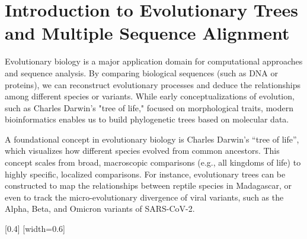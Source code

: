 


\section{Introduction to Evolutionary Trees and Multiple Sequence Alignment}

Evolutionary biology is a major application domain for computational approaches and sequence analysis. By comparing biological sequences (such as DNA or proteins), we can reconstruct evolutionary processes and deduce the relationships among different species or variants. While early conceptualizations of evolution, such as Charles Darwin's "tree of life," focused on morphological traits, modern bioinformatics enables us to build phylogenetic trees based on molecular data.

A foundational concept in evolutionary biology is Charles Darwin's ``tree of life'', which visualizes how different species evolved from common ancestors. This concept scales from broad, macroscopic comparisons (e.g., all kingdoms of life) to highly specific, localized comparisons. For instance, evolutionary trees can be constructed to map the relationships between reptile species in Madagascar, or even to track the micro-evolutionary divergence of viral variants, such as the Alpha, Beta, and Omicron variants of SARS-CoV-2.


[0.4]
[width=0.6\textwidth]

